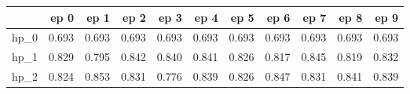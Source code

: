 \begin{tabular}{lrrrrrrrrrr}
\toprule
{} &   ep 0 &   ep 1 &   ep 2 &   ep 3 &   ep 4 &   ep 5 &   ep 6 &   ep 7 &   ep 8 &   ep 9 \\
\midrule
hp\_0 &  0.693 &  0.693 &  0.693 &  0.693 &  0.693 &  0.693 &  0.693 &  0.693 &  0.693 &  0.693 \\
hp\_1 &  0.829 &  0.795 &  0.842 &  0.840 &  0.841 &  0.826 &  0.817 &  0.845 &  0.819 &  0.832 \\
hp\_2 &  0.824 &  0.853 &  0.831 &  0.776 &  0.839 &  0.826 &  0.847 &  0.831 &  0.841 &  0.839 \\
\bottomrule
\end{tabular}
